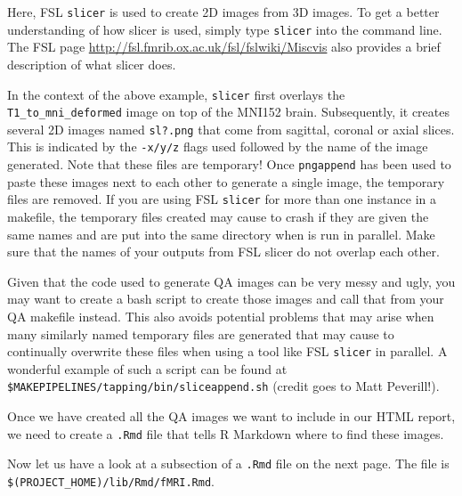 Here, FSL \texttt{slicer} is used to create 2D images from 3D images. To get a better understanding of how slicer is used, simply type \texttt{slicer} into the command line. The FSL page \url{http://fsl.fmrib.ox.ac.uk/fsl/fslwiki/Miscvis} also provides a brief description of what slicer does. 

In the context of the above example, \texttt{slicer} first overlays the \texttt{T1_to_mni_deformed} image on top of the MNI152 brain. Subsequently, it creates several 2D images named \texttt{sl?.png} that come from sagittal, coronal or axial slices. This is indicated by the \texttt{-x/y/z} flags used followed by the name of the image generated. Note that these files are temporary! Once \texttt{pngappend} has been used to paste these images next to each other to generate a single image, the temporary files are removed. If you are using FSL \texttt{slicer} for more than one instance in a makefile, the temporary files created may cause \maken{} to crash if they are given the same names and are put into the same directory when \maken{} is run in parallel. Make sure that the names of your outputs from FSL slicer do not overlap each other. 

Given that the code used to generate QA images can be very messy and ugly, you may want to create a bash script to create those images and call that from your QA makefile instead. This also avoids potential problems that may arise when many similarly named temporary files are generated that may cause \maken{} to continually overwrite these files when using a tool like FSL \texttt{slicer} in parallel. A wonderful example of such a script can be found at \texttt{\$MAKEPIPELINES/tapping/bin/sliceappend.sh} (credit goes to Matt Peverill!). 

Once we have created all the QA images we want to include in our HTML report, we need to create a \texttt{.Rmd} file that tells R Markdown where to find these images. 

Now let us have a look at a subsection of a \texttt{.Rmd} file on the next page. The file is \texttt{\$(PROJECT\_HOME)/lib/Rmd/fMRI.Rmd}. 
\clearpage


